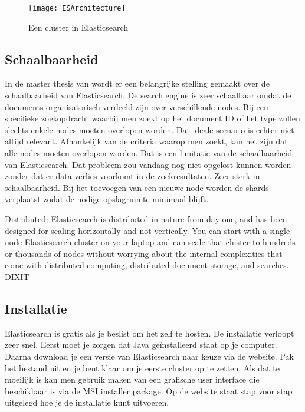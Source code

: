 \begin{figure}
	\centering
	\texttt{[image: ESArchitecture]}
	\caption{Een cluster in Elasticsearch}
	\label{fig:ESArchitecture}
\end{figure}

\subsection{Schaalbaarheid}

In de master thesis van \textcite{Berglund2013} wordt er een belangrijke stelling gemaakt over de schaalbaarheid van Elasticsearch. De search engine is zeer schaalbaar omdat de documents organisatorisch verdeeld zijn over verschillende nodes. Bij een specifieke zoekopdracht waarbij men zoekt op het document ID of het type zullen slechts enkele nodes moeten overlopen worden. Dat ideale scenario is echter niet altijd relevant. Afhankelijk van de criteria waarop men zoekt, kan het zijn dat alle nodes moeten overlopen worden. Dat is een limitatie van de schaalbaarheid van Elasticsearch. Dat probleem zou vandaag nog niet opgelost kunnen worden zonder dat er data-verlies voorkomt in de zoekresultaten. Zeer sterk in schaalbaarheid. Bij het toevoegen van een nieuwe node worden de shards verplaatst zodat de nodige opslagruimte minimaal blijft.  

Distributed: Elasticsearch is distributed in nature from day one, and has been designed for scaling horizontally and not vertically. You can start with a single-node Elasticsearch cluster on your laptop and can scale that cluster to hundreds or thousands of nodes without worrying about the internal complexities that come with distributed computing, distributed document storage, and searches. DIXIT

\subsection{Installatie}
\label{Installatie}

Elasticsearch is gratis als je beslist om het zelf te hosten. De installatie verloopt zeer snel. Eerst moet je zorgen dat Java geïnstalleerd staat op je computer. Daarna download je een versie van Elasticsearch naar keuze via de website. Pak het bestand uit en je bent klaar om je eerste cluster op te zetten. Als dat te moeilijk is kan men gebruik maken van een grafische user interface die beschikbaar is via de MSI installer package. Op de website staat stap voor stap uitgelegd hoe je de installatie kunt uitvoeren. 


